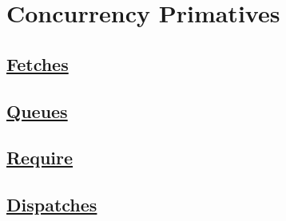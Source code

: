 \section{Concurrency Primatives}



\subsection*{\href{https://github.com/d3/d3-fetch}{Fetches}}



\subsection*{\href{https://github.com/d3/d3-queue}{Queues}}



\subsection*{\href{https://github.com/d3/d3-require}{Require}}



\subsection*{\href{https://github.com/d3/d3-dispatch}{Dispatches}}